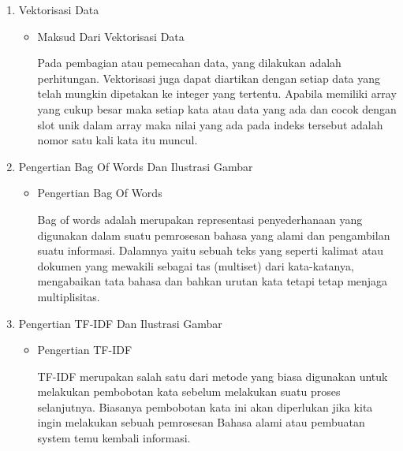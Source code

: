 \begin{enumerate}
\begin{itemize}
\par
\end{itemize}
\par
\par
\item Vektorisasi Data
\begin{itemize}
\item Maksud Dari Vektorisasi Data
\par Pada pembagian atau pemecahan data, yang dilakukan adalah perhitungan. Vektorisasi juga dapat diartikan dengan setiap data yang telah mungkin dipetakan ke integer yang  tertentu. Apabila memiliki array yang cukup besar maka setiap kata  atau data yang ada dan cocok dengan slot unik dalam array maka nilai yang ada pada indeks tersebut adalah nomor satu kali kata itu muncul.
\par
\end{itemize}
\par
\par
\item Pengertian Bag Of Words Dan Ilustrasi Gambar
\begin{itemize}
\item  Pengertian Bag Of Words
\par Bag of words adalah merupakan representasi penyederhanaan yang digunakan dalam  suatu pemrosesan bahasa yang alami dan pengambilan suatu informasi. Dalamnya yaitu sebuah teks yang seperti kalimat atau dokumen yang  mewakili sebagai tas (multiset) dari kata-katanya, mengabaikan tata bahasa dan bahkan urutan kata tetapi tetap menjaga multiplisitas.
\par
\end{itemize}
\par
\par
\item Pengertian TF-IDF Dan Ilustrasi Gambar
\begin{itemize}
\item  Pengertian TF-IDF
\par TF-IDF merupakan salah satu dari metode yang biasa digunakan untuk melakukan pembobotan kata sebelum melakukan suatu  proses selanjutnya. Biasanya pembobotan kata ini akan diperlukan jika kita ingin melakukan sebuah  pemrosesan Bahasa alami atau pembuatan system temu kembali informasi. 
\par
\end{itemize}
\par
\par
\end{enumerate}